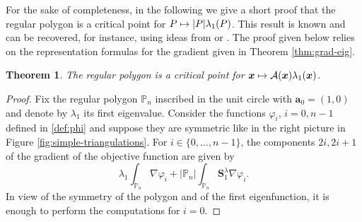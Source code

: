 \documentclass[11pt]{article}
\numberwithin{equation}{section}\newtheorem*{jepEnonce}{\jepEnonceTitle}\newenvironment{enonce*}[1]{\def\jepEnonceTitle{#1}\jepEnonce}{\endjepEnonce}\newtheorem*{conj*}{Conjecture}
\def\mto{\mathchoice{\longmapsto}{\mapsto}{\mapsto}{\mapsto}}
\theoremstyle{plain}
\newtheorem{thm}{Theorem}[section]
\theoremstyle{definition}
\newcommand{\bo}[1]{{\boldsymbol#1}}
\let\Bbb\mathbb
\begin{document}
For the sake of completeness, in the following we give a short proof that the regular polygon is a critical point for $P\mto |P|\lambda_1(P)$. This result is known and can be recovered, for instance, using ideas from \cite{FragalaVelichkov19} or \cite[Ch.\,1]{beniphd}. The proof given below relies on the representation formulas for the gradient given in Theorem \ref{thm:grad-eig}.

\begin{thm}
The regular polygon is a critical point for $\bo x \mto \mathcal A(\bo x)\lambda_1(\bo x)$.
\label{thm:critical-point}
\end{thm}

\begin{proof}
Fix the regular polygon $\Bbb P_n$ inscribed in the unit circle with $\bo a_0 = (1,0)$ and denote by $\lambda_1$ its first eigenvalue.
Consider the functions $\varphi_i$, $i=0,n-1$ defined in \eqref{def:phi} and suppose they are symmetric like in the right picture in Figure \ref{fig:simple-triangulations}. For $i \in \{0,\dots,n-1\}$, the components $2i, 2i+1$ of the gradient of the objective function are given by
\[
\lambda_1 \int_{\Bbb P_n} \nabla \varphi_i + |\Bbb P_n| \int_{\Bbb P_n} \bo S_1^\lambda \nabla \varphi_i.
\]
In view of the symmetry of the polygon and of the first eigenfunction, it is enough to perform the computations for $i=0$.


\end{proof}
\end{document}
